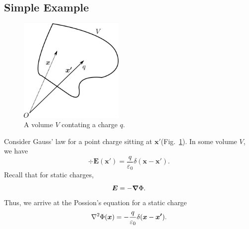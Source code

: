 \documentclass[12pt,english]{article}
\renewcommand{\vec}[1]{\boldsymbol{#1}}
\begin{document}
\subsection{Simple Example}
\begin{figure}[H]
    \centering
    \includegraphics[width = 0.45\textwidth]{chargeinV.png}
    \caption{A volume $V$ contating a charge $q$.}
    \label{fig:chargeinV}
\end{figure}
Consider Gauss' law for a point charge sitting at $\vec{x'}$(Fig.~\ref{fig:chargeinV}). In some volume $V$, we have
\begin{equation*}
    \div \vec{E}(\vec{x'}) = \frac{q}{\varepsilon_0}\delta(\vec{x}-\vec{x'}).
\end{equation*}
Recall that for static charges,
\begin{equation*}
    \vec{E} = -\grad \Phi.
\end{equation*}
Thus, we arrive at the Possion's equation for a static charge
\begin{equation}
    \laplacian\Phi(\vec{x}) = -\frac{q}{\varepsilon_0}\delta(\vec{x} - \vec{x'}).
\end{equation}
\end{document}
